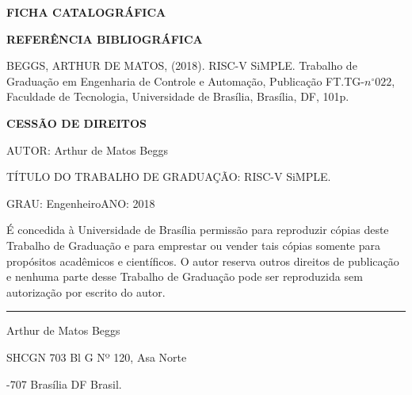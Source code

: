 \noindent \textbf{FICHA CATALOGRÁFICA}

\noindent %

\noindent \medskip{}


\noindent \textbf{REFERÊNCIA BIBLIOGRÁFICA}

BEGGS, ARTHUR DE MATOS, (2018). RISC-V SiMPLE. Trabalho de Graduação
em Engenharia de Controle e Automação, Publicação FT.TG-$n^{\circ}022$,
Faculdade de Tecnologia, Universidade de Brasília, Brasília, DF, 101p.

\noindent \bigskip{}


\noindent \textbf{CESSÃO DE DIREITOS}

\noindent AUTOR: Arthur de Matos Beggs

TÍTULO DO TRABALHO DE GRADUAÇÃO: RISC-V SiMPLE.

\noindent \medskip{}


\noindent GRAU: Engenheiro\hfill{}ANO: 2018\hfill{}

\noindent \medskip{}


É concedida à Universidade de Brasília permissão para reproduzir cópias
deste Trabalho de Graduação e para emprestar ou vender tais cópias
somente para propósitos acadêmicos e científicos. O autor reserva
outros direitos de publicação e nenhuma parte desse Trabalho de Graduação
pode ser reproduzida sem autorização por escrito do autor.

\noindent \bigskip{}


\noindent \rule[0.5ex]{1\columnwidth}{1pt}

\noindent Arthur de Matos Beggs

\noindent SHCGN 703 Bl G Nº 120, Asa Norte

-707 Brasília \textendash{} DF \textendash{} Brasil.
